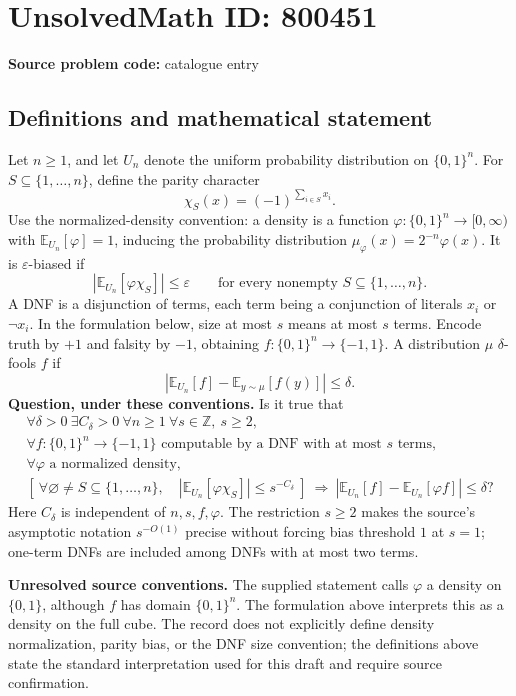 \documentclass[11pt]{article}
\newcommand{\Z}{\mathbb{Z}}
\begin{document}
\section*{UnsolvedMath ID: 800451}
\textbf{Source problem code:} catalogue entry
\subsection{Definitions and mathematical statement}
Let \(n\geq 1\), and let \(U_n\) denote the uniform probability distribution on \(\{0,1\}^n\). For \(S\subseteq\{1,\ldots,n\}\), define the parity character
\[
\chi_S(x)=(-1)^{\sum_{i\in S}x_i}.
\]
Use the normalized-density convention: a density is a function \(\varphi:\{0,1\}^n\to[0,\infty)\) with \(\mathbb E_{U_n}[\varphi]=1\), inducing the probability distribution \(\mu_\varphi(x)=2^{-n}\varphi(x)\). It is \(\varepsilon\)-biased if
\[
\left|\mathbb E_{U_n}[\varphi\chi_S]\right|\leq\varepsilon
\qquad\text{for every nonempty }S\subseteq\{1,\ldots,n\}.
\]
A DNF is a disjunction of terms, each term being a conjunction of literals \(x_i\) or \(\neg x_i\). In the formulation below, size at most \(s\) means at most \(s\) terms. Encode truth by \(+1\) and falsity by \(-1\), obtaining \(f:\{0,1\}^n\to\{-1,1\}\). A distribution \(\mu\) \(\delta\)-fools \(f\) if
\[
\left|\mathbb E_{U_n}[f]-\mathbb E_{y\sim\mu}[f(y)]\right|\leq\delta.
\]
\textbf{Question, under these conventions.} Is it true that
\[
\begin{gathered}
\forall\delta>0\ \exists C_\delta>0\ \forall n\geq1\ \forall s\in\Z,\ s\geq2,\\
\forall f:\{0,1\}^n\to\{-1,1\}\text{ computable by a DNF with at most }s\text{ terms},\\
\forall\varphi\text{ a normalized density},\\
\left[\ \forall\varnothing\ne S\subseteq\{1,\ldots,n\},\quad
\left|\mathbb E_{U_n}[\varphi\chi_S]\right|\leq s^{-C_\delta}\ \right]
\ \Longrightarrow\ 
\left|\mathbb E_{U_n}[f]-\mathbb E_{U_n}[\varphi f]\right|\leq\delta?
\end{gathered}
\]
Here \(C_\delta\) is independent of \(n,s,f,\varphi\). The restriction \(s\geq2\) makes the source's asymptotic notation \(s^{-O(1)}\) precise without forcing bias threshold \(1\) at \(s=1\); one-term DNFs are included among DNFs with at most two terms.

\textbf{Unresolved source conventions.} The supplied statement calls \(\varphi\) a density on \(\{0,1\}\), although \(f\) has domain \(\{0,1\}^n\). The formulation above interprets this as a density on the full cube. The record does not explicitly define density normalization, parity bias, or the DNF size convention; the definitions above state the standard interpretation used for this draft and require source confirmation.
\end{document}
